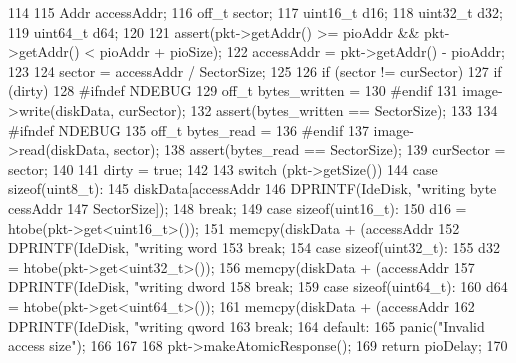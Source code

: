 \begin{DoxyCode}
114 {
115     Addr accessAddr;
116     off_t sector;
117     uint16_t d16;
118     uint32_t d32;
119     uint64_t d64;
120 
121     assert(pkt->getAddr() >= pioAddr && pkt->getAddr() < pioAddr + pioSize);
122     accessAddr = pkt->getAddr() - pioAddr;
123 
124     sector = accessAddr / SectorSize;
125 
126     if (sector != curSector) {
127         if (dirty) {
128 #ifndef NDEBUG
129             off_t bytes_written =
130 #endif
131                 image->write(diskData, curSector);
132             assert(bytes_written == SectorSize);
133         }
134 #ifndef NDEBUG
135         off_t bytes_read =
136 #endif
137             image->read(diskData,  sector);
138         assert(bytes_read == SectorSize);
139         curSector = sector;
140     }
141     dirty = true;
142 
143     switch (pkt->getSize()) {
144       case sizeof(uint8_t):
145         diskData[accessAddr %
146         DPRINTF(IdeDisk, "writing byte %
      cessAddr %
147                 SectorSize]);
148         break;
149       case sizeof(uint16_t):
150         d16 = htobe(pkt->get<uint16_t>());
151         memcpy(diskData + (accessAddr %
152         DPRINTF(IdeDisk, "writing word %
153         break;
154       case sizeof(uint32_t):
155         d32 = htobe(pkt->get<uint32_t>());
156         memcpy(diskData + (accessAddr %
157         DPRINTF(IdeDisk, "writing dword %
158         break;
159       case sizeof(uint64_t):
160         d64 = htobe(pkt->get<uint64_t>());
161         memcpy(diskData + (accessAddr %
162         DPRINTF(IdeDisk, "writing qword %
163         break;
164       default:
165         panic("Invalid access size\n");
166     }
167 
168     pkt->makeAtomicResponse();
169     return pioDelay;
170 }
\end{DoxyCode}


